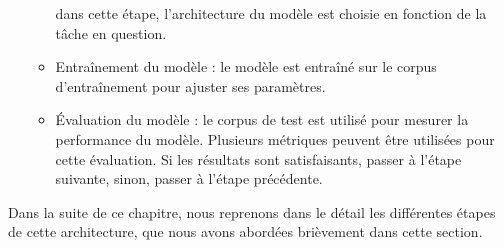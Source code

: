 \begin{enumerate}[label=(\roman*)]
\begin{itemize}
        dans cette étape, l'architecture du modèle est choisie en fonction de la tâche en question.
        \item Entraînement du modèle :
        le modèle est entraîné sur le corpus d'entraînement pour ajuster ses paramètres.
        \item Évaluation du modèle :
        le corpus de test est utilisé pour mesurer la performance du modèle.
        Plusieurs métriques peuvent être utilisées pour cette évaluation.
        Si les résultats sont satisfaisants, passer à l'étape suivante, sinon, passer à l'étape précédente.
    \end{itemize}
\end{enumerate}

Dans la suite de ce chapitre, 
nous reprenons dans le détail les différentes étapes de cette architecture, 
que nous avons abordées brièvement dans cette section.